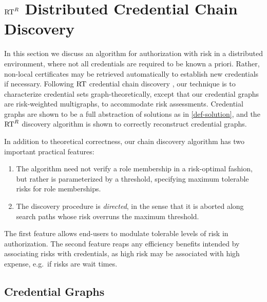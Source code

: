 \section{$\text{RT}^R$ Distributed Credential Chain Discovery}
\label{section-chain-discovery}
\label{section-rtr-discovery}

In this section we discuss an algorithm for authorization with risk in
a distributed environment, where not all credentials are required to
be known a priori.  Rather, non-local certificates may be retrieved
automatically to establish new credentials if necessary.  Following
$\text{RT}$ credential chain discovery \cite{Li:2003-02}, our technique is
to characterize credential sets graph-theoretically, except that our
credential graphs are risk-weighted multigraphs, to accommodate risk
assessments.  Credential graphs are shown to be a full abstraction of
solutions as in \autoref{def-solution}, and the $\text{RT}^R$ discovery
algorithm is shown to correctly reconstruct credential graphs.

In addition to theoretical correctness, our chain discovery algorithm
has two important practical features:
\begin{enumerate}
  \item The algorithm need not verify a role membership in a
  risk-optimal fashion, but rather is parameterized by 
  a threshold, specifying maximum tolerable risks for role 
  memberships.
 \item The discovery procedure is \emph{directed}, in the sense that
it is aborted along search paths whose risk overruns the maximum
threshold.
\end{enumerate}
The first feature allows end-users to modulate tolerable levels of
risk in authorization.  The second feature reaps any efficiency
benefits intended by associating risks with credentials, as high risk
may be associated with high expense, e.g.~if risks are wait times.


\subsection{Credential Graphs}
\label{section-credential-graphs}


